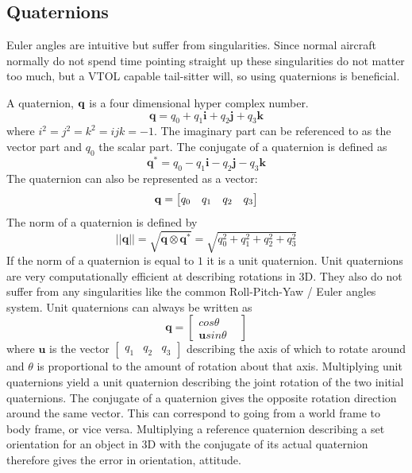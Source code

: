 \documentclass{article}
\begin{document}
\subsection{Quaternions}
Euler angles are intuitive but suffer from singularities.
Since normal aircraft normally do not spend time pointing straight up these singularities do not matter too much, but a VTOL capable tail-sitter will, so using quaternions is beneficial.

A quaternion, $\bold{q}$ is a four dimensional hyper complex number.\cite{P2}
\begin{equation}
 \mathbf{q} = q_0 + q_1 \mathbf{i} + q_2 \mathbf{j} + q_3 \mathbf{k}
\end{equation}
where $i^2 = j^2 = k^2 = ijk = -1$.\cite{Sola2016}
The imaginary part can be referenced to as the vector part and $q_0$ the scalar part.
The conjugate of a quaternion is defined as
\begin{equation}
     \mathbf{q^*} = q_0 - q_1 \mathbf{i} - q_2 \mathbf{j} - q_3 \mathbf{k}
\end{equation}
The quaternion can also be represented as a vector:
\begin{equation}
     \bold{q} = \left[
     \begin{matrix}
     q_0 &q_1 &q_2 &q_3
     \end{matrix}\right]
\end{equation}
The norm of a quaternion is defined by
\begin{equation}
    ||\mathbf{q}|| = \sqrt{\mathbf{q} \otimes \mathbf{q}^*} = \sqrt{q_0^2 + q_1^2 + q_2^2 + q_3^2}
\end{equation}
If the norm of a quaternion is equal to $1$ it is a unit quaternion.
Unit quaternions are very computationally efficient at describing rotations in 3D.
They also do not suffer from any singularities like the common Roll-Pitch-Yaw / Euler angles system.
Unit quaternions can always be written as
\begin{equation}
    \mathbf{q} = \left[\begin{matrix} cos \theta &\\ \mathbf{u} sin \theta\end{matrix}\right]
\end{equation}
where $\mathbf{u}$ is the vector $\left[\begin{matrix} q_1 & q_2 & q_3 \end{matrix}\right]$
describing the axis of which to rotate around and $\theta$ is proportional to the amount of rotation about that axis.
Multiplying unit quaternions yield a unit quaternion describing the joint rotation of the two initial quaternions.
The conjugate of a quaternion gives the opposite rotation direction around the same vector.
This can correspond to going from a world frame to body frame, or vice versa.
Multiplying a reference quaternion describing a set orientation for an object in 3D with the conjugate of its actual quaternion therefore gives the error in orientation, attitude.
\end{document}
